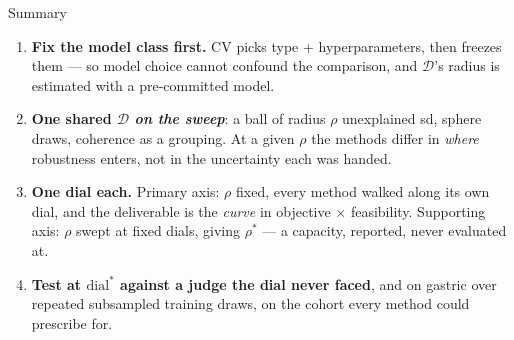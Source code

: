 \documentclass{beamer}
\begin{document}
\begin{frame}{Summary}
  \small
  \begin{enumerate}
    \item \textbf{Fix the model class first.} CV picks type + hyperparameters, then
      freezes them --- so model choice cannot confound the comparison, and
      $\mathcal D$'s radius is estimated with a pre-committed model.
    \item \textbf{One shared $\mathcal D$ \emph{on the sweep}}: a ball of radius
      $\rho$ unexplained sd, sphere draws, coherence as a grouping. At a given
      $\rho$ the methods differ in \emph{where} robustness enters, not in the
      uncertainty each was handed.
    \item \textbf{One dial each.} Primary axis: $\rho$ fixed, every method walked
      along its own dial, and the deliverable is the \emph{curve} in objective
      $\times$ feasibility. Supporting axis: $\rho$ swept at fixed dials, giving
      $\rho^\ast$ --- a capacity, reported, never evaluated at.
    \item \textbf{Test at $\text{dial}^\ast$ against a judge the dial never
      faced}, and on gastric over repeated subsampled training draws, on the
      cohort every method could prescribe for.
  \end{enumerate}
\end{frame}
\end{document}
